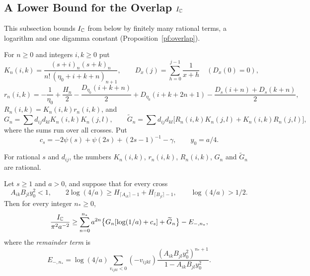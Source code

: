 \subsection{\texorpdfstring{A Lower Bound for the Overlap $I_\mathbb C$}{A Lower Bound for the Overlap}}

This subsection bounds $I_\mathbb C$ from below by finitely many rational terms, a
logarithm and one digamma constant (Proposition~\ref{pf:overlap}).

\begin{definition}\label{pf:overlap-coefficients}
For $n\ge0$ and integers $i,k\ge0$ put
\[
 K_n(i,k)=\frac{(s+i)_n(s+k)_n}{n!\,(\eta_0+i+k+n)_{n+1}},\qquad
 D_x(j)=\sum_{h=0}^{j-1}\frac1{x+h}\quad(D_x(0)=0),
\]
\[
 r_n(i,k)=-\frac1{\eta_0}+\frac{H_n}2-\frac{D_{\eta_0}(i+k+n)}2
 +D_{\eta_0}(i+k+2n+1)-\frac{D_s(i+n)+D_s(k+n)}2,
\]
$R_n(i,k)=K_n(i,k)r_n(i,k)$, and
\[
 G_n=\sum d_{ij}d_{kl}K_n(i,k)K_n(j,l),\qquad
 \widetilde G_n=\sum d_{ij}d_{kl}\bigl[R_n(i,k)K_n(j,l)+K_n(i,k)R_n(j,l)\bigr],
\]
where the sums run over all crosses. Put
\begin{equation}\label{pf:student-constant}
 c_s=-2\psi(s)+\psi(2s)+(2s-1)^{-1}-\gamma ,\qquad y_0=a/4 .
\end{equation}
\end{definition}

For rational $s$ and $d_{ij}$, the numbers $K_n(i,k)$, $r_n(i,k)$,
$R_n(i,k)$, $G_n$ and $\widetilde G_n$ are rational.

\begin{proposition}\label{pf:overlap}
Let $s\ge1$ and $a>0$, and suppose that for every cross
\begin{equation}\label{pf:cross-threshold}
 A_{ik}B_{jl}y_0^2<1,\qquad
 2\log(4/a)\ge H_{\lceil A_{ik}\rceil-1}+H_{\lceil B_{jl}\rceil-1},
 \qquad \log(4/a)>1/2 .
\end{equation}
Then for every integer $n_*\ge0$,
\begin{equation}\label{pf:collected-overlap}
 \frac{I_\mathbb C}{\pi^2a^{-2}}\ge
 \sum_{n=0}^{n_*}a^{2n}\bigl\{G_n[\log(1/a)+c_s]+\widetilde G_n\bigr\}
 -E_{-,n_*},
\end{equation}
where the \emph{remainder term} is
\[
 E_{-,n_*}=\log(4/a)\sum_{v_{ijkl}<0}(-v_{ijkl})
 \frac{(A_{ik}B_{jl}y_0^2)^{n_*+1}}{1-A_{ik}B_{jl}y_0^2}.
\]
\end{proposition}

